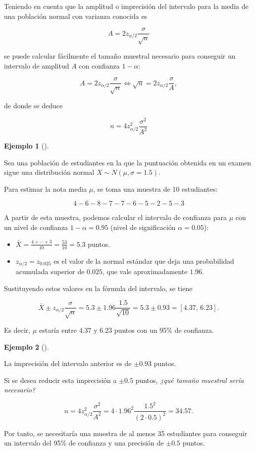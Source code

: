 \documentclass[
  a4paper,
]{scrreport}
\providecommand{\tightlist}{%
  \setlength{\itemsep}{0pt}\setlength{\parskip}{0pt}}\usepackage{longtable,booktabs,array}
\theoremstyle{plain}
\theoremstyle{definition}
\newtheorem{example}{Ejemplo}[chapter]
\theoremstyle{definition}
\theoremstyle{remark}
\begin{document}
Teniendo en cuenta que la amplitud o imprecisión del intervalo para la
media de una población normal con varianza conocida es

\[
A= 2 z_{\alpha/2}\frac{\sigma}{\sqrt{n}}
\]

se puede calcular fácilmente el tamaño muestral necesario para conseguir
un intervalo de amplitud \(A\) con confianza \(1-\alpha\):

\[
A= 2 z_{\alpha/2}\frac{\sigma}{\sqrt{n}} \Leftrightarrow \sqrt{n}= 2 z_{\alpha/2}\frac{\sigma}{A},
\]

de donde se deduce

\[
{n = 4 z_{\alpha/2}^2\frac{\sigma^2}{A^2}}
\]

\begin{example}[]\protect\hypertarget{exm-intervalo-confianza-media}{}\label{exm-intervalo-confianza-media}

Sea una población de estudiantes en la que la puntuación obtenida en un
examen sigue una distribución normal \(X\sim N(\mu,\sigma=1.5)\).

Para estimar la nota media \(\mu\), se toma una muestra de 10
estudiantes:

\[
4 - 6 - 8 - 7 - 7 - 6 - 5 - 2 - 5 - 3
\]

A partir de esta muestra, podemos calcular el intervalo de confianza
para \(\mu\) con un nivel de confianza \(1-\alpha=0.95\) (nivel de
significación \(\alpha=0.05\)):

\begin{itemize}
\tightlist
\item
  \(\bar X = \frac{4+\cdots+3}{10}= \frac{53}{10} = 5.3\) puntos.
\item
  \(z_{\alpha/2}=z_{0.025}\) es el valor de la normal estándar que deja
  una probabilidad acumulada superior de \(0.025\), que vale
  aproximadamente \(1.96\).
\end{itemize}

Sustituyendo estos valores en la fórmula del intervalo, se tiene

\[
\bar{X}\pm z_{\alpha/2}\frac{\sigma}{\sqrt{n}} = 5.3\pm 1.96\frac{1.5}{\sqrt{10}} = 5.3\pm 0.93 = \left[4.37,\,6.23\right].
\]

Es decir, \(\mu\) estaría entre \(4.37\) y \(6.23\) puntos con un 95\%
de confianza.

\end{example}

\begin{example}[]\protect\hypertarget{exm-tamaño-muestral-media}{}\label{exm-tamaño-muestral-media}

La imprecisión del intervalo anterior es de \(\pm 0.93\) puntos.

Si se desea reducir esta imprecisión a \(\pm 0.5\) puntos, \emph{¿qué
tamaño muestral sería necesario?}

\[
n = 4 z_{\alpha/2}^2\frac{\sigma^2}{A^2} = 4\cdot 1.96^2\frac{1.5^2}{(2\cdot 0.5)^2} = 34.57.
\]

Por tanto, se necesitaría una muestra de al menos 35 estudiantes para
conseguir un intervalo del 95\% de confianza y una precisión de
\(\pm 0.5\) puntos.

\end{example}
\end{document}

